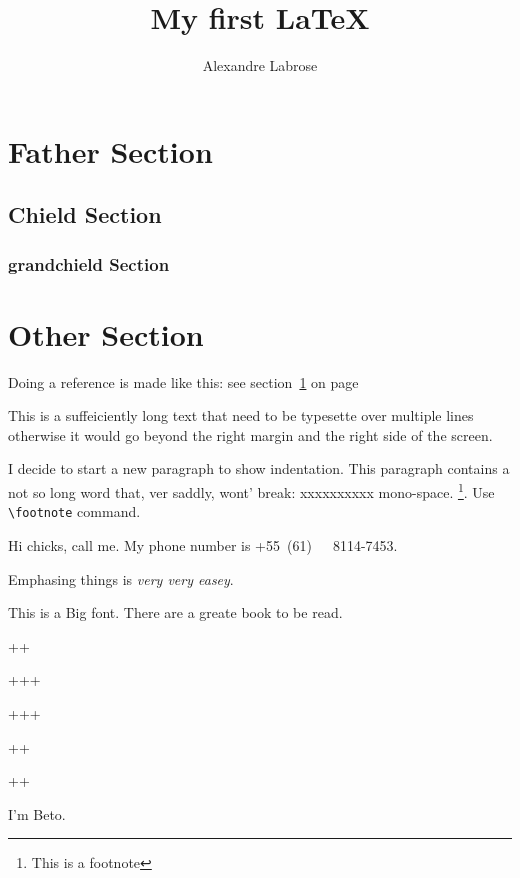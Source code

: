 \documentclass[letterpaper, twocolumn, twoside]{article}
\title{My f{}irst \LaTeX{}}
\author{Alexandre Labrose}
\newcommand{\beto}{I'm {\huge Beto}.}
\begin{document}
\maketitle
\section{Father Section}\label{here}
\subsection{Chield Section}
\subsubsection{grandchield Section}
\section{Other Section}
Doing a reference is made like this: see section~\ref{here} on page~\pageref{here}

This is a suffeiciently long text that need to be typesette over multiple lines otherwise it would go beyond the right margin and the right side of the screen.

I decide to start a new paragraph to show indentation. This paragraph contains a not so long word that, ver saddly, wont' break: xxxxxxxxxx mono-space.
\footnote{This is a footnote}. Use \verb|\footnote| command.

Hi \hspace{.20em}chicks, call me. My phone number is \mbox{+55 (61)\ \ \ 8114-7453}.

Emphasing things is \emph{very \emph{very} easey}.

This is a {\Huge{Big}} font.
There are a greate book \cite{myart2015} to be read.

+\hfill+

+\hspace{1em}+\hfill+

+\hfill+\hfill+


+\hrulefill+

+\dotfill+

\beto


\end{document}
